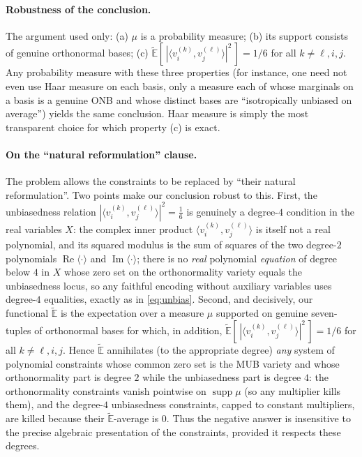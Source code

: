 \documentclass{amsart}
\theoremstyle{definition}
\begin{document}
\paragraph{Robustness of the conclusion.}
The argument used only: (a) $\mu$ is a probability measure; (b) its support consists of genuine
orthonormal bases; (c) $\widetilde{\mathbb{E}}[\,|\langle v^{(k)}_i,v^{(\ell)}_j\rangle|^2\,]=1/6$
for all $k\ne\ell,i,j$. Any probability measure with these three properties (for instance, one
need not even use Haar measure on each basis, only a measure each of whose marginals on a basis
is a genuine ONB and whose distinct bases are ``isotropically unbiased on average'') yields the
same conclusion. Haar measure is simply the most transparent choice for which
property (c) is exact.

\paragraph{On the ``natural reformulation'' clause.}
The problem allows the constraints to be replaced by ``their natural reformulation''.
Two points make our conclusion robust to this. First, the unbiasedness relation
$|\langle v^{(k)}_i,v^{(\ell)}_j\rangle|^2=\tfrac16$ is genuinely a degree-$4$ condition in
the real variables $X$: the complex inner product $\langle v^{(k)}_i,v^{(\ell)}_j\rangle$ is
itself not a real polynomial, and its squared modulus is the sum of squares of the two
degree-$2$ polynomials $\operatorname{Re}\langle\cdot\rangle$ and
$\operatorname{Im}\langle\cdot\rangle$; there is no \emph{real} polynomial \emph{equation} of
degree below $4$ in $X$ whose zero set on the orthonormality variety equals the unbiasedness
locus, so any faithful encoding without auxiliary variables uses degree-$4$ equalities, exactly
as in \eqref{eq:unbias}. Second, and decisively, our functional $\widetilde{\mathbb{E}}$ is the
expectation over a measure $\mu$ supported on genuine seven-tuples of orthonormal bases for
which, in addition, $\widetilde{\mathbb{E}}[\,|\langle v^{(k)}_i,v^{(\ell)}_j\rangle|^2\,]=1/6$
for all $k\ne\ell,i,j$. Hence $\widetilde{\mathbb{E}}$ annihilates (to the appropriate degree)
\emph{any} system of polynomial constraints whose common zero set is the MUB variety and whose
orthonormality part is degree $2$ while the unbiasedness part is degree $4$: the orthonormality
constraints vanish pointwise on $\operatorname{supp}\mu$ (so any multiplier kills them), and the
degree-$4$ unbiasedness constraints, capped to constant multipliers, are killed because their
$\widetilde{\mathbb{E}}$-average is $0$. Thus the negative answer is insensitive to the precise
algebraic presentation of the constraints, provided it respects these degrees.
\end{document}
